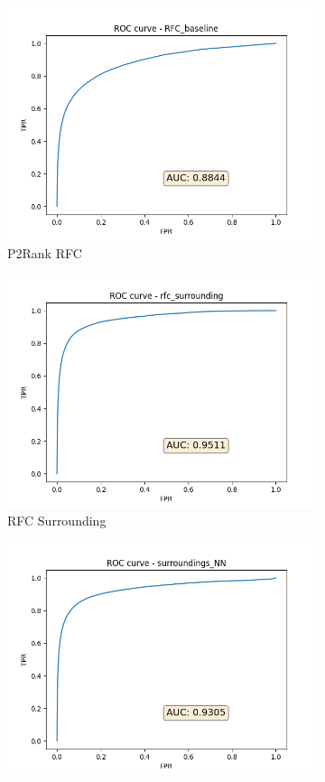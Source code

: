 \begin{figure}%
\centering
\begin{subfigure}{0.45\textwidth}
    \centering
    \includegraphics[width=0.95\linewidth]{roc_baseline.png}
    \caption{P2Rank RFC}
\end{subfigure}%
\begin{subfigure}{0.45\textwidth}
    \centering
    \includegraphics[width=0.95\linewidth]{roc_big_rfc.png}
    \caption{RFC Surrounding}
\end{subfigure}
\begin{subfigure}{0.45\textwidth}
    \centering
    \includegraphics[width=0.95\linewidth]{roc_nn.png}

\end{subfigure}
\end{figure}
